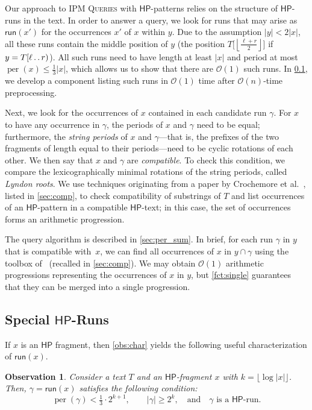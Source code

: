 \documentclass[a4paper]{article}
\newtheorem{observation}[theorem]{Observation}
\theoremstyle{definition}
\theoremstyle{remark}
\newcommand{\IPM}{\textsc{IPM Queries}\xspace}
\newcommand{\HP}{\mathsf{HP}}
\newcommand{\floor}[1]{\left\lfloor #1 \right\rfloor}
\newcommand{\dd}{\mathinner{\ldotp\ldotp}}
\DeclareMathOperator{\per}{per}
\newcommand{\Oh}{\mathcal{O}}
\newcommand{\run}{\mathsf{run}}
\begin{document}
Our approach to \IPM with $\HP$-patterns relies on the structure of $\HP$-runs in the text. In order to answer a query, we look for runs that may arise as $\run(x')$ for the occurrences $x'$ of $x$ within $y$.
Due to the assumption $|y|<2|x|$, all these runs contain the middle position of $y$  (the position $T\big[\floor{\frac{\ell+r}{2}}\big]$ if  $y=T[\ell\dd r)$).
All such runs need to have length at least $|x|$ and period at most $\per(x)\le \frac13|x|$, which allows us to show that there are $\Oh(1)$ such runs.
In \cref{sec:finder}, we develop a component listing such runs in $\Oh(1)$ time after $\Oh(n)$-time preprocessing.

 Next, we look for the occurrences of $x$ contained in each candidate run $\gamma$.
 For $x$ to have any occurrence in $\gamma$, the periods of $x$ and $\gamma$ need to be equal;
 furthermore, the \emph{string periods} of $x$ and $\gamma$---that is, the prefixes of the two fragments of length equal to their periods---need to be cyclic rotations of each other.
 We then say that $x$ and $\gamma$ are \emph{compatible}.
 To check this condition, we compare the lexicographically minimal rotations of the string periods, called \emph{Lyndon roots}.
 We use techniques originating from a paper by Crochemore et al.~\cite{DBLP:journals/tcs/CrochemoreIKRRW14}, listed in \cref{sec:comp},
 to check compatibility of substrings of $T$ and list occurrences of an $\HP$-pattern in a compatible $\HP$-text;
 in this case, the set of occurrences forms an arithmetic progression.
 
 The query algorithm is described in \cref{sec:per_sum}.
 In brief, for each run $\gamma$ in $y$ that is compatible with~$x$, we can find all occurrences of $x$ in $y\cap \gamma$ using the toolbox of~\cite{DBLP:journals/tcs/CrochemoreIKRRW14} (recalled in \cref{sec:comp}).
 We may obtain $\Oh(1)$ arithmetic progressions representing the occurrences of $x$ in $y$,
 but \cref{fct:single} guarantees that they can be merged into a single progression.


\subsection{Special $\HP$-Runs}\label{sec:finder}
If $x$ is an $\HP$ fragment, then \cref{obs:char} yields the following useful characterization of $\run(x)$.

\begin{observation}
Consider a text $T$ and an $\HP$-fragment $x$ with $k=\lfloor \log |x|\rfloor$. 
Then, $\gamma=\run(x)$ satisfies the following condition:
\begin{equation}\label{eq:obs:sprun}
\per(\gamma)< \tfrac13 \cdot 2^{k+1},\qquad |\gamma|\ge 2^k,\quad\text{and}\quad\text{$\gamma$ is a $\HP$-run}.
\end{equation}
\end{observation} 
\end{document}
